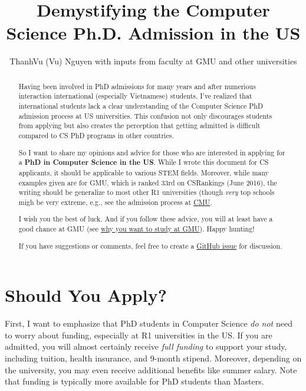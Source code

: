 \documentclass[10pt]{article}
\title{Demystifying the Computer Science Ph.D. Admission in the US}
\date{}
\author{ThanhVu (Vu) Nguyen with inputs from faculty at GMU and other universities}
\begin{document}
\maketitle

\begin{abstract}
Having been involved in PhD admissions for many years and after
numerious interaction international (especially Vietnamese) students, I've
realized that international students lack a clear understanding of
the Computer Science PhD admission process at US universities. This confusion not only
discourages students from applying but also creates the perception that
getting admitted is difficult compared to CS PhD programs in other countries.

So I want to share my opinions and advice for those who are interested in applying for a \textbf{PhD in Computer Science in the US}.
While I wrote this document for CS applicants, it should be applicable to various STEM fields.
Moreover, while many examples given are for GMU, which is ranked 33rd on CSRankings (June 2016), the writing should be generalize to most other R1 universities  (though \emph{very} top schools migh be very extreme, e.g., see the admission process at \href{https://da-data.blogspot.com/2015/03/reflecting-on-cs-graduate-admissions.html}{CMU}.

I wish you the best of luck. And if you follow these advice,
you will at least have a good chance at GMU (see
\href{https://github.com/dynaroars/dynaroars.github.io/wiki/About-GMU}{why
you want to study at GMU}). Happy hunting!

If you have suggestions or comments, feel free to create a \href{https://github.com/dynaroars/dynaroars.github.io/issues}{GitHub issue} for discussion.
\end{abstract}

\section{Should You Apply?}


First, I want to emphasize that PhD students in Computer
Science \emph{do not} need to worry about funding, especially at R1
universities in the US. If you are admitted, you will almost certainly
receive \emph{full funding} to support your study, including tuition,
health insurance, and 9-month stipend. Moreover, depending on the university,
you may even receive additional benefits like summer salary. Note that
funding is typically more available for PhD students than 
Masters. %
\end{document}
